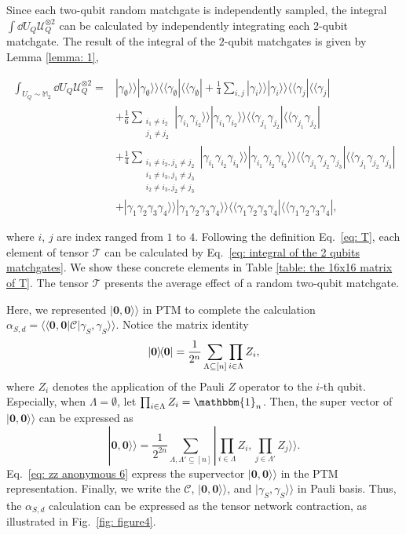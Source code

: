 \documentclass[showpacs,twocolumn,aps,prx,long bibliography,superscriptaddress,notitlepage]{revtex4-1}
\newcommand{\supket}[1]{|#1 \rangle\rangle}
\newcommand{\supbra}[1]{\langle\langle #1 |}
\newcommand{\supketbra}[2]{
    \supket{#1 } \supket{#1 } \supbra{#2} \supbra{#2} 
}
\newcommand{\Tcal}{\mathcal{T}}
\newcommand{\Mbb}{\mathbb{M}}
\begin{document}
Since each two-qubit random matchgate is independently sampled, the integral $\int \dd U_Q \mathcal{U}_Q^{\otimes 2}$ can be calculated by independently integrating each 2-qubit matchgate. The result of the integral of the $2$-qubit matchgates is given by Lemma \ref{lemma: 1},
\begin{widetext}
    \begin{equation}
\label{eq: integral of the 2 qubits matchgates}
\begin{aligned}
    \int_{U_Q\sim \Mbb_2} \dd U_Q\mathcal{U}_Q^{\otimes 2} =& \supketbra{\gamma_\emptyset}{\gamma_\emptyset}
    + \frac{1}{4} \sum_{i,j} \supketbra{\gamma_i}{\gamma_j}\\
    &+ \frac{1}{6}\sum_{\substack{i_1\neq i_2 \\ j_1\neq j_2}}\supketbra{\gamma_{i_1}\gamma_{i_2}}{\gamma_{j_1}\gamma_{j_2}} \\
    &+ \frac{1}{4}
    \sum_{\substack{i_1\neq i_2, j_1 \neq j_2 \\ 
        i_1\neq i_3, j_1 \neq j_3 \\
        i_2\neq i_3, j_2 \neq j_3} 
    }
    \supketbra{\gamma_{i_1}\gamma_{i_2}\gamma_{i_3}}{\gamma_{j_1}\gamma_{j_2}\gamma_{j_3}}\\
    &+ \supketbra{\gamma_1\gamma_2\gamma_3\gamma_4}{\gamma_1\gamma_2\gamma_3\gamma_4},
\end{aligned}
\end{equation}
\end{widetext}

where $i$, $j$ are index ranged from $1$ to $4$. Following the definition Eq.~\eqref{eq: T}, each element of tensor $\Tcal$ can be calculated by Eq.~\eqref{eq: integral of the 2 qubits matchgates}.
We show these concrete elements in Table \ref{table: the 16x16 matrix of T}.  The tensor $\Tcal$ presents the average effect of a random two-qubit matchgate.


Here, we represented $\supket{\bm 0,\bm 0}$ in PTM to complete the calculation $\alpha_{S,d} = \supbra{\bm 0,\bm 0} \mathcal{C}\supket{\gamma_S, \gamma_S}$.
Notice the matrix identity 
\begin{equation}
    \ketbra{\bm 0} = \frac{1}{2^n} \sum_{\Lambda\subseteq [n]} \prod_{i \in \Lambda} Z_i,
\end{equation}
where $Z_i$ denotes the application of the Pauli $Z$ operator to the $i$-th qubit.
Especially, when $\Lambda = \emptyset$, let $\prod_{i \in \Lambda} Z_i = \mathbbm{1}_n$. Then, the super vector of $\supket{\bm 0, \bm 0}$ can be expressed as
\begin{equation}
\label{eq: zz anonymous 6}
    \supket{\bm 0, \bm 0} = \frac{1}{2^{2n}} \sum_{\Lambda, \Lambda' \subseteq [n]}  \supket{\prod_{i \in \Lambda }  Z_i, \prod_{j \in \Lambda'} Z_j}.
\end{equation}
Eq.~\eqref{eq: zz anonymous 6} express the supervector $\supket{\bm 0, \bm 0}$ in the PTM representation. Finally, we write the $\mathcal{C}$, $\supket{\bm 0, \bm 0}$, and $\supket{\gamma_S, \gamma_S}$ in Pauli basis.
Thus, the $\alpha_{S,d}$ calculation can be expressed as the tensor network contraction, as illustrated in Fig.~\ref{fig: figure4}.
\end{document}
